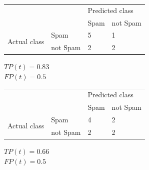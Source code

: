 \documentclass[a4paper]{article}
\theoremstyle{definition}
\newenvironment{soln}{
    \leavevmode\color{blue}\ignorespaces
}{}
\begin{document}
\begin{enumerate}
\begin{enumerate}
\begin{soln}
                  \begin{center}
                     \label{tab:title}
                    \begin{tabular}{l l | l l}
                                                    &          & \multicolumn{2}{l}{Predicted class}            \\
                                                    &          & Spam                                & not Spam \\
                      \hline
                      \multirow{2}{*}{Actual class} & Spam     & 5                                   & 1        \\
                                                    & not Spam & 2                                   & 2
                    \end{tabular}
                  \end{center}
                  $TP(t) = 0.83$\\
                  $FP(t) = 0.5$

                  \begin{center}
                     \label{tab:title}
                    \begin{tabular}{l l | l l}
                                                    &          & \multicolumn{2}{l}{Predicted class}            \\
                                                    &          & Spam                                & not Spam \\
                      \hline
                      \multirow{2}{*}{Actual class} & Spam     & 4                                   & 2        \\
                                                    & not Spam & 2                                   & 2
                    \end{tabular}
                  \end{center}
                  $TP(t) = 0.66$\\
                  $FP(t) = 0.5$


\end{soln}
\end{enumerate}
\end{enumerate}
\end{document}
